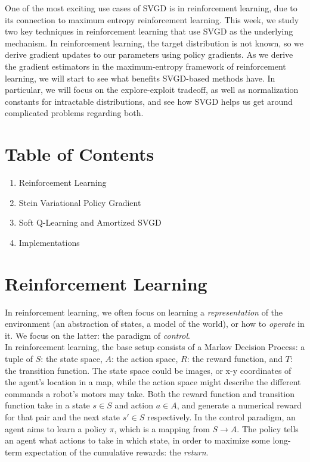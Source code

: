 \documentclass[12pt]{article}
\begin{document}
	\MakeScribeTop


One of the most exciting use cases of SVGD is in reinforcement learning, due to its connection to maximum entropy reinforcement learning. This week, we study two key techniques in reinforcement learning that use SVGD as the underlying mechanism. In reinforcement learning, the target distribution is not known, so we derive gradient updates to our parameters using policy gradients. As we derive the gradient estimators in the maximum-entropy framework of reinforcement learning, we will start to see what benefits SVGD-based methods have. In particular, we will focus on the explore-exploit tradeoff, as well as normalization constants for intractable distributions, and see how SVGD helps us get around complicated problems regarding both. 

\section{Table of Contents}

\begin{enumerate}
    \item Reinforcement Learning
    \item Stein Variational Policy Gradient
    \item Soft Q-Learning and Amortized SVGD
    \item Implementations
\end{enumerate}

\section{Reinforcement Learning}

In reinforcement learning, we often focus on learning a \textit{representation} of the environment (an abstraction of states, a model of the world), or how to \textit{operate} in it. We focus on the latter: the paradigm of \textit{control}.\\

\noindent In reinforcement learning, the base setup consists of a Markov Decision Process: a tuple of $S$: the state space, $A$: the action space, $R$: the reward function, and $T$: the transition function. The state space could be images, or x-y coordinates of the agent's location in a map, while the action space might describe the different commands a robot's motors may take. Both the reward function and transition function take in a state $s \in S$ and action $a \in A$, and generate a numerical reward for that pair and the next state $s' \in S$ respectively. In the control paradigm, an agent aims to learn a policy $\pi$, which is a mapping from $S \rightarrow A$. The policy tells an agent what actions to take in which state, in order to maximize some long-term expectation of the cumulative rewards: the \textit{return}. \\
\end{document}
